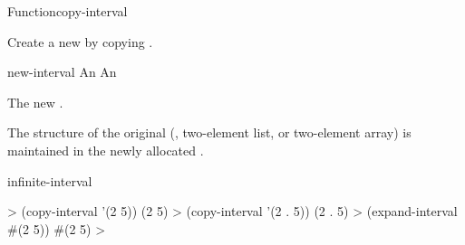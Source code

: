 \documentclass[10pt,twoside,english,pdftex]{article}
\begin{document}
\begin{functiondoc}{Function}{copy-interval}%
  {
    }
%
%

\fnsyntax

\fnpurpose Create a new  by copying .

\fnpackage {}

\fnmodule {}

\fnargs
\begin{args}{new-interval}
\arg[interval] An 
 An 
\end{args}

\fnreturns The new .

\fndescription The structure of the original  (,
two-element list, or two-element array) is maintained in the newly allocated
.

\begin{alsos}{infinite-interval}
\end{alsos}

\fnexamples
%
\W\supp
\begin{example}
  > (copy-interval '(2 5))
  (2 5)
  > (copy-interval '(2 . 5))
  (2 . 5)
  > (expand-interval #(2 5))
  #(2 5)
  >
\end{example}

\end{functiondoc}

\end{document}
